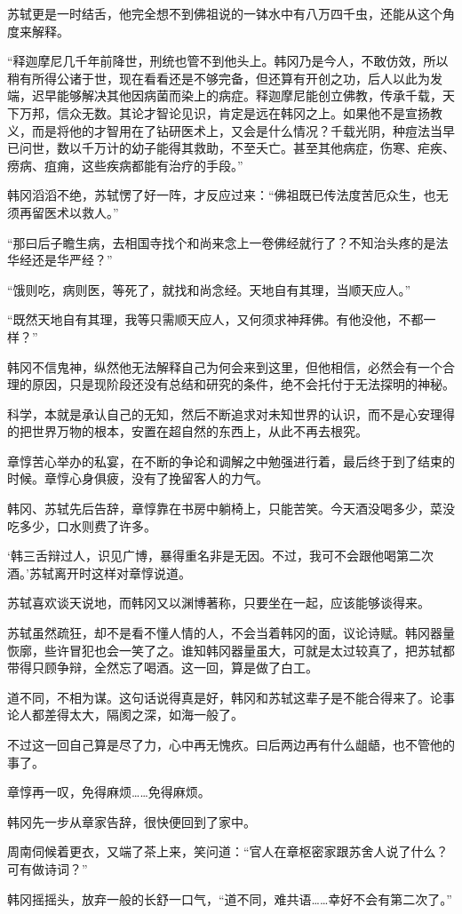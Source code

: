 苏轼更是一时结舌，他完全想不到佛祖说的一钵水中有八万四千虫，还能从这个角度来解释。

“释迦摩尼几千年前降世，刑统也管不到他头上。韩冈乃是今人，不敢仿效，所以稍有所得公诸于世，现在看看还是不够完备，但还算有开创之功，后人以此为发端，迟早能够解决其他因病菌而染上的病症。释迦摩尼能创立佛教，传承千载，天下万邦，信众无数。其论才智论见识，肯定是远在韩冈之上。如果他不是宣扬教义，而是将他的才智用在了钻研医术上，又会是什么情况？千载光阴，种痘法当早已问世，数以千万计的幼子能得其救助，不至夭亡。甚至其他病症，伤寒、疟疾、痨病、疽痈，这些疾病都能有治疗的手段。”

韩冈滔滔不绝，苏轼愣了好一阵，才反应过来：“佛祖既已传法度苦厄众生，也无须再留医术以救人。”

“那曰后子瞻生病，去相国寺找个和尚来念上一卷佛经就行了？不知治头疼的是法华经还是华严经？”

“饿则吃，病则医，等死了，就找和尚念经。天地自有其理，当顺天应人。”

“既然天地自有其理，我等只需顺天应人，又何须求神拜佛。有他没他，不都一样？”

韩冈不信鬼神，纵然他无法解释自己为何会来到这里，但他相信，必然会有一个合理的原因，只是现阶段还没有总结和研究的条件，绝不会托付于无法探明的神秘。

科学，本就是承认自己的无知，然后不断追求对未知世界的认识，而不是心安理得的把世界万物的根本，安置在超自然的东西上，从此不再去根究。

章惇苦心举办的私宴，在不断的争论和调解之中勉强进行着，最后终于到了结束的时候。章惇心身俱疲，没有了挽留客人的力气。

韩冈、苏轼先后告辞，章惇靠在书房中躺椅上，只能苦笑。今天酒没喝多少，菜没吃多少，口水则费了许多。

‘韩三舌辩过人，识见广博，暴得重名非是无因。不过，我可不会跟他喝第二次酒。’苏轼离开时这样对章惇说道。

苏轼喜欢谈天说地，而韩冈又以渊博著称，只要坐在一起，应该能够谈得来。

苏轼虽然疏狂，却不是看不懂人情的人，不会当着韩冈的面，议论诗赋。韩冈器量恢廓，些许冒犯也会一笑了之。谁知韩冈器量虽大，可就是太过较真了，把苏轼都带得只顾争辩，全然忘了喝酒。这一回，算是做了白工。

道不同，不相为谋。这句话说得真是好，韩冈和苏轼这辈子是不能合得来了。论事论人都差得太大，隔阂之深，如海一般了。

不过这一回自己算是尽了力，心中再无愧疚。曰后两边再有什么龃龉，也不管他的事了。

章惇再一叹，免得麻烦……免得麻烦。

韩冈先一步从章家告辞，很快便回到了家中。

周南伺候着更衣，又端了茶上来，笑问道：“官人在章枢密家跟苏舍人说了什么？可有做诗词？”

韩冈摇摇头，放弃一般的长舒一口气，“道不同，难共语……幸好不会有第二次了。”
